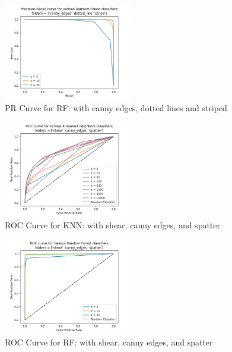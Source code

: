 \begin{figure}[htbp]
    \centerline{\includegraphics[width=0.5\textwidth]{resources/precision_recall_rf_canny_edges_dotted_line_stripe.png}}    
    \caption{PR Curve for RF: with canny edges, dotted lines and striped}\label{fig12}
\end{figure}

\begin{figure}[htbp]
    \centerline{\includegraphics[width=0.5\textwidth]{resources/roc_curve_knn_shear_canny_edges_spatter.png}}    
    \caption{ROC Curve for KNN: with shear, canny edges, and spatter}\label{fig13}
\end{figure}

\begin{figure}[htbp]
    \centerline{\includegraphics[width=0.5\textwidth]{resources/roc_curve_rf_shear_canny_edges_spatter.png}}    
    \caption{ROC Curve for RF: with shear, canny edges, and spatter}\label{fig14}
\end{figure}

